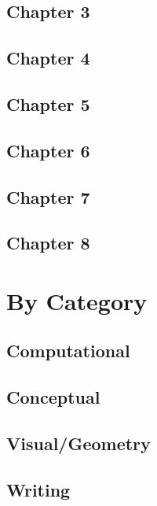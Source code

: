 \documentclass[12pt,oneside,english]{matchapter}
\numberwithin{equation}{section}
\numberwithin{figure}{section}
\begin{document}
\subsection*{Chapter 3}

\subsection*{Chapter 4}

\subsection*{Chapter 5}

\subsection*{Chapter 6}

\subsection*{Chapter 7}

\subsection*{Chapter 8}


\section*{By Category}

\subsection*{Computational}
\label{sec:Compu}

\subsection*{Conceptual}
\label{sec:Concep}

\subsection*{Visual/Geometry}
\label{sec:Visgeo}

\subsection*{Writing}
\label{sec:Writ}
\end{document}
